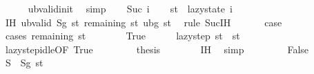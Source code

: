 \begin{isabellebody}
\ \ \ \ \isamarkupfalse%
\ ub{\isacharunderscore}{\kern0pt}valid{\isacharunderscore}{\kern0pt}init\ \isamarkupfalse%
\ simp\isanewline
{}\isamarkupfalse%
\isanewline
\ \ \isamarkupfalse%
\ {\isacharparenleft}{\kern0pt}Suc\ i{\isacharparenright}{\kern0pt}\isanewline
\ \ \isamarkupfalse%
\ {\isacharquery}{\kern0pt}st\ {\isacharequal}{\kern0pt}\ {\isachardoublequoteopen}lazy{\isacharunderscore}{\kern0pt}state\ i{\isachardoublequoteclose}\isanewline
\ \ \isamarkupfalse%
\ IH{\isacharcolon}{\kern0pt}\ {\isachardoublequoteopen}ub{\isacharunderscore}{\kern0pt}valid\ {\isacharparenleft}{\kern0pt}Sg\ {\isacharquery}{\kern0pt}st{\isacharparenright}{\kern0pt}\ {\isacharparenleft}{\kern0pt}remaining\ {\isacharquery}{\kern0pt}st{\isacharparenright}{\kern0pt}\ {\isacharparenleft}{\kern0pt}ubg\ {\isacharquery}{\kern0pt}st{\isacharparenright}{\kern0pt}{\isachardoublequoteclose}\ \isamarkupfalse%
\ {\isacharparenleft}{\kern0pt}rule\ Suc{\isachardot}{\kern0pt}IH{\isacharparenright}{\kern0pt}\isanewline
\ \ \isanewline
\ \ \isamarkupfalse%
\ {\isacharquery}{\kern0pt}case\isanewline
\ \ \isamarkupfalse%
\ {\isacharparenleft}{\kern0pt}cases\ {\isachardoublequoteopen}remaining\ {\isacharquery}{\kern0pt}st\ {\isacharequal}{\kern0pt}\ {\isacharbraceleft}{\kern0pt}{\isacharbraceright}{\kern0pt}{\isachardoublequoteclose}{\isacharparenright}{\kern0pt}\isanewline
\ \ \ \ \isamarkupfalse%
\ True\isanewline
\ \ \ \ \isamarkupfalse%
\ {\isachardoublequoteopen}lazy{\isacharunderscore}{\kern0pt}step\ {\isacharquery}{\kern0pt}st\ {\isacharequal}{\kern0pt}\ {\isacharquery}{\kern0pt}st{\isachardoublequoteclose}\ \isanewline
\ \ \ \ \ \ \isamarkupfalse%
\ lazy{\isacharunderscore}{\kern0pt}step{\isacharunderscore}{\kern0pt}idle{\isacharbrackleft}{\kern0pt}OF\ True{\isacharbrackright}{\kern0pt}\ \isakeywordONE{{\isachardot}{\kern0pt}}\isamarkupfalse%
\isanewline
\ \ \ \ \isamarkupfalse%
\ \isamarkupfalse%
\ {\isacharquery}{\kern0pt}thesis\isanewline
\ \ \ \ \ \ \isamarkupfalse%
\ IH\ \isamarkupfalse%
\ simp\isanewline
\ \ \isamarkupfalse%
\isanewline
\ \ \ \ \isamarkupfalse%
\ False\isanewline
\ \ \ \ \isamarkupfalse%
\ {\isacharquery}{\kern0pt}S\ {\isacharequal}{\kern0pt}\ {\isachardoublequoteopen}Sg\ {\isacharquery}{\kern0pt}st{\isachardoublequoteclose}\isanewline

\end{isabellebody}
